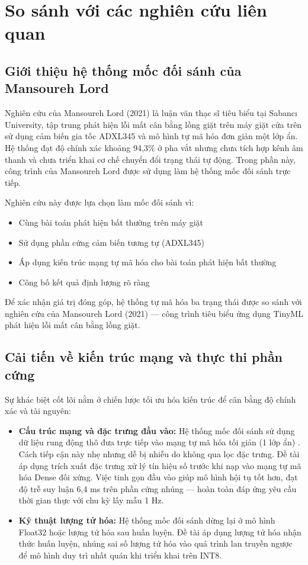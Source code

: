 \section{So sánh với các nghiên cứu liên quan}
\label{sec:so_sanh_baseline}

\subsection{Giới thiệu hệ thống mốc đối sánh của Mansoureh Lord}

Nghiên cứu của Mansoureh Lord (2021) \cite{ref_1_lord} là luận văn thạc sĩ tiêu biểu tại Sabancı University, tập trung phát hiện lỗi mất cân bằng lồng giặt trên máy giặt cửa trên sử dụng cảm biến gia tốc ADXL345 và mô hình tự mã hóa đơn giản một lớp ẩn. Hệ thống đạt độ chính xác khoảng 94,3\% ở pha vắt nhưng chưa tích hợp kênh âm thanh và chưa triển khai cơ chế chuyển đổi trạng thái tự động. Trong phần này, công trình của Mansoureh Lord được sử dụng làm hệ thống mốc đối sánh trực tiếp.

Nghiên cứu này được lựa chọn làm mốc đối sánh vì:
\begin{itemize}
    \item Cùng bài toán phát hiện bất thường trên máy giặt
    \item Sử dụng phần cứng cảm biến tương tự (ADXL345)
    \item Áp dụng kiến trúc mạng tự mã hóa cho bài toán phát hiện bất thường
    \item Công bố kết quả định lượng rõ ràng
\end{itemize}

Để xác nhận giá trị đóng góp, hệ thống tự mã hóa ba trạng thái được so sánh với nghiên cứu của Mansoureh Lord (2021) \cite{ref_1_lord} — công trình tiêu biểu ứng dụng TinyML phát hiện lỗi mất cân bằng lồng giặt.

\subsection{Cải tiến về kiến trúc mạng và thực thi phần cứng}

Sự khác biệt cốt lõi nằm ở chiến lược tối ưu hóa kiến trúc để cân bằng độ chính xác và tài nguyên:
\begin{itemize}
    \item \textbf{Cấu trúc mạng và đặc trưng đầu vào:} Hệ thống mốc đối sánh sử dụng dữ liệu rung động thô đưa trực tiếp vào mạng tự mã hóa tối giản (1 lớp ẩn) \cite{ref_1_lord}. Cách tiếp cận này nhẹ nhưng dễ bị nhiễu do không qua lọc đặc trưng. Đề tài áp dụng trích xuất đặc trưng xử lý tín hiệu số trước khi nạp vào mạng tự mã hóa Dense đối xứng. Việc tinh gọn đầu vào giúp mô hình hội tụ tốt hơn, đạt độ trễ suy luận 6,4 ms trên phần cứng nhúng — hoàn toàn đáp ứng yêu cầu thời gian thực với chu kỳ lấy mẫu 1 Hz.
    
    \item \textbf{Kỹ thuật lượng tử hóa:} Hệ thống mốc đối sánh dừng lại ở mô hình Float32 hoặc lượng tử hóa sau huấn luyện. Đề tài áp dụng lượng tử hóa nhận thức huấn luyện, nhúng sai số lượng tử hóa vào quá trình lan truyền ngược để mô hình duy trì nhất quán khi triển khai trên INT8.
\end{itemize}

